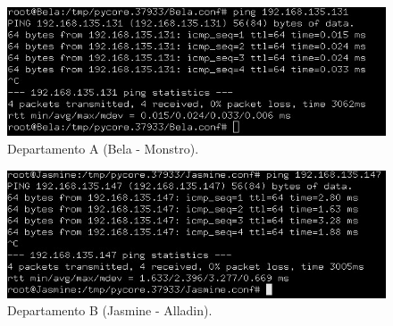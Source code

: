     
    \begin{minipage}{0.5\linewidth}
    \centering
        \begin{figure}[H]
        \includegraphics[width=\linewidth]{images/ParteII/Questao3/questao3-DepA-Bela-Monstro.jpg}
        \caption{Departamento A (Bela - Monstro).} \label{parteII-questao3-ping-Bela-Monstro}
        \end{figure}
    \end{minipage}
    \begin{minipage}{0.5\linewidth}
    \centering
        \begin{figure}[H]
        \includegraphics[width=\linewidth]{images/ParteII/Questao3/questao3-DepB-Jasmine-Alladin.jpg}
        \caption{Departamento B (Jasmine - Alladin).} \label{parteII-questao3-ping-Jamsmine-Alladin}
        \end{figure}
    \end{minipage}
    
